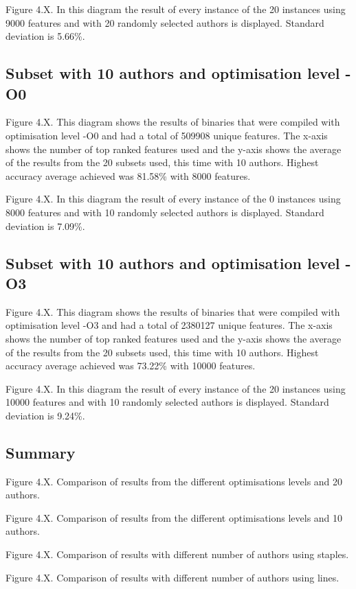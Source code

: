 \documentclass[a4paper,11pt]{kth-mag}
\begin{document}
Figure 4.X.  In this diagram the result of every instance of the 20 instances
using 9000 features and with 20 randomly selected authors is displayed.
Standard deviation is 5.66\%.

\subsection{Subset with 10 authors and optimisation level -O0}
Figure 4.X.  This diagram shows the results of binaries that were compiled
with optimisation level -O0 and had a total of 509908 unique features. The
x-axis shows the number of top ranked features used and the y-axis shows the
average of the results from the 20 subsets used, this time with 10 authors.
Highest accuracy average achieved was 81.58\% with 8000 features.

Figure 4.X. In this diagram the result of every instance of the 0 instances
using 8000 features and with 10 randomly selected authors is displayed.
Standard deviation is 7.09\%.

\subsection{Subset with 10 authors and optimisation level -O3}
Figure 4.X. This diagram shows the results of binaries that were compiled with
optimisation level -O3 and had a total of 2380127 unique features. The x-axis
shows the number of top ranked features used and the y-axis shows the average
of the results from the 20 subsets used, this time with 10 authors. Highest
accuracy average achieved was 73.22\% with 10000 features.

Figure 4.X. In this diagram the result of every instance of the 20 instances
using 10000 features and with 10 randomly selected authors is displayed.
Standard deviation is 9.24\%.

\subsection{Summary}
Figure 4.X. Comparison of results from the different optimisations levels and
20 authors.

Figure 4.X. Comparison of results from the different optimisations levels and
10 authors.

Figure 4.X. Comparison of results with different number of authors using
staples.

Figure 4.X. Comparison of results with different number of authors using
lines.
\end{document}
